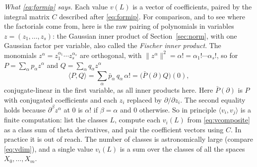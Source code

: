 \documentclass[11pt]{amsart}
\numberwithin{equation}{section}
\theoremstyle{definition}
\theoremstyle{remark}
\begin{document}
\emph{What \eqref{eq:formip} says.} Each value $v(L)$ is a vector of coefficients, paired by the integral matrix $C$ described after \eqref{eq:formip}. For comparison, and to see where the factorials come from, here is the raw pairing of polynomials in variables $z=(z_1,\dots,z_s)$: the Gaussian inner product of Section~\ref{sec:norm}, with one Gaussian factor per variable, also called the \emph{Fischer inner product}. The monomials $z^\alpha=z_1^{\alpha_1}\cdots z_s^{\alpha_s}$ are orthogonal, with $\|z^\alpha\|^2=\alpha!=\alpha_1!\cdots\alpha_s!$, so for $P=\sum_\alpha p_\alpha z^\alpha$ and $Q=\sum_\alpha q_\alpha z^\alpha$
\begin{equation}\label{eq:fischer}
 \langle P,Q\rangle=\sum_\alpha\bar p_\alpha\,q_\alpha\,\alpha!=\bigl(\bar P(\partial)Q\bigr)(0),
\end{equation}
conjugate-linear in the first variable, as all inner products here. Here $\bar P(\partial)$ is $P$ with conjugated coefficients and each $z_i$ replaced by $\partial/\partial z_i$. The second equality holds because $\partial^\beta z^\alpha$ at $0$ is $\alpha!$ if $\beta=\alpha$ and $0$ otherwise. So in principle $\langle v_i,v_j\rangle$ is a finite computation: list the classes $L$, compute each $v_i(L)$ from \eqref{eq:vcomposite} as a class sum of theta derivatives, and pair the coefficient vectors using $C$. In practice it is out of reach. The number of classes is astronomically large (compare \eqref{eq:vdim}), and a single value $v_i(L)$ is a sum over the classes of all the spaces $X_0,\dots,X_m$.
\end{document}
